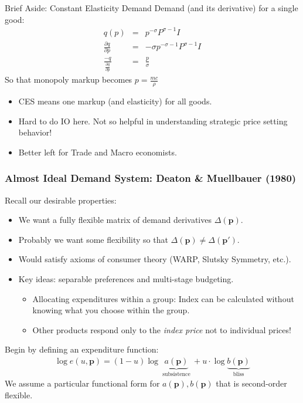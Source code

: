 \begin{frame}{Brief Aside: Constant Elasticity Demand}
Demand (and its derivative) for a single good:
\begin{eqnarray*}
q(p) &=& p^{-\sigma} P^{\sigma-1} I \\
\frac{\partial q}{\partial p} &=& -\sigma p^{-\sigma-1} P^{\sigma-1} I\\
\frac{-q}{\frac{\partial q}{\partial p} } &=& \frac{p}{\sigma}
\end{eqnarray*}
So that monopoly markup becomes $ p = \frac{ mc}{\rho}$
\begin{itemize}
\item CES means one markup (and elasticity) for all goods.
\item Hard to do IO here. Not so helpful in understanding strategic price setting behavior!
\item Better left for Trade and Macro economists.
\end{itemize}
\end{frame}



\begin{frame}
\frametitle{Almost Ideal Demand System: Deaton \& Muellbauer (1980)}
Recall our desirable properties:
\begin{itemize}
\item We want a fully flexible matrix of demand derivatives $\Delta(\mathbf{p})$.
\item Probably we want some flexibility so that $\Delta(\mathbf{p}) \neq \Delta(\mathbf{p'})$.
\item Would satisfy axioms of consumer theory (WARP, Slutsky Symmetry, etc.).
\item Key ideas: \alert{separable preferences} and \alert{multi-stage budgeting}.
\begin{itemize}
\item Allocating expenditures within a group: Index can be calculated without knowing what you choose within the group.
\item Other products respond only to the \textit{index price} not to individual prices!
\end{itemize}
\end{itemize}
Begin by defining an expenditure function:
\begin{eqnarray*}
\log e(u,\mathbf{p}) = (1- u) \log \underbrace{a(\mathbf{p})}_{\text{ subsistence }} + u \cdot \log \underbrace{b(\mathbf{p})}_{\text{ bliss }}
\end{eqnarray*}
We assume a particular functional form for $a(\mathbf{p}),b(\mathbf{p})$ that is second-order flexible.
\end{frame}

